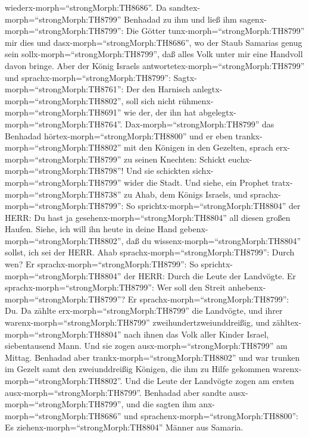 wiederx-morph=``strongMorph:TH8686''.  Da
sandtex-morph=``strongMorph:TH8799'' Benhadad zu ihm und ließ ihm
sagenx-morph=``strongMorph:TH8799'': Die Götter
tunx-morph=``strongMorph:TH8799'' mir dies und
dasx-morph=``strongMorph:TH8686'', wo der Staub Samarias genug sein
sollx-morph=``strongMorph:TH8799'', daß alles Volk unter mir eine
Handvoll davon bringe.  Aber der König Israels
antwortetex-morph=``strongMorph:TH8799'' und
sprachx-morph=``strongMorph:TH8799'':
Sagtx-morph=``strongMorph:TH8761'': Der den Harnisch
anlegtx-morph=``strongMorph:TH8802'', soll sich nicht
rühmenx-morph=``strongMorph:TH8691'' wie der, der ihn hat
abgelegtx-morph=``strongMorph:TH8764''. 
Dax-morph=``strongMorph:TH8799'' das Benhadad
hörtex-morph=``strongMorph:TH8800'' und er eben
trankx-morph=``strongMorph:TH8802'' mit den Königen in den Gezelten,
sprach erx-morph=``strongMorph:TH8799'' zu seinen Knechten: Schickt
euchx-morph=``strongMorph:TH8798''! Und sie schickten
sichx-morph=``strongMorph:TH8799'' wider die Stadt.  Und
siehe, ein Prophet tratx-morph=``strongMorph:TH8738'' zu Ahab, dem
Königs Israels, und sprachx-morph=``strongMorph:TH8799'': So
sprichtx-morph=``strongMorph:TH8804'' der HERR: Du hast ja
gesehenx-morph=``strongMorph:TH8804'' all diesen großen Haufen. Siehe,
ich will ihn heute in deine Hand gebenx-morph=``strongMorph:TH8802'',
daß du wissenx-morph=``strongMorph:TH8804'' sollst, ich sei der HERR.
 Ahab sprachx-morph=``strongMorph:TH8799'': Durch wen? Er
sprachx-morph=``strongMorph:TH8799'': So
sprichtx-morph=``strongMorph:TH8804'' der HERR: Durch die Leute der
Landvögte. Er sprachx-morph=``strongMorph:TH8799'': Wer soll den Streit
anhebenx-morph=``strongMorph:TH8799''? Er
sprachx-morph=``strongMorph:TH8799'': Du.  Da zählte
erx-morph=``strongMorph:TH8799'' die Landvögte, und ihrer
warenx-morph=``strongMorph:TH8799'' zweihundertzweiunddreißig, und
zähltex-morph=``strongMorph:TH8804'' nach ihnen das Volk aller Kinder
Israel, siebentausend Mann.  Und sie zogen
ausx-morph=``strongMorph:TH8799'' am Mittag. Benhadad aber
trankx-morph=``strongMorph:TH8802'' und war trunken im Gezelt samt den
zweiunddreißig Königen, die ihm zu Hilfe gekommen
warenx-morph=``strongMorph:TH8802''.  Und die Leute der
Landvögte zogen am ersten ausx-morph=``strongMorph:TH8799''. Benhadad
aber sandte ausx-morph=``strongMorph:TH8799'', und die sagten ihm
anx-morph=``strongMorph:TH8686'' und
sprachenx-morph=``strongMorph:TH8800'': Es
ziehenx-morph=``strongMorph:TH8804'' Männer aus Samaria. 
